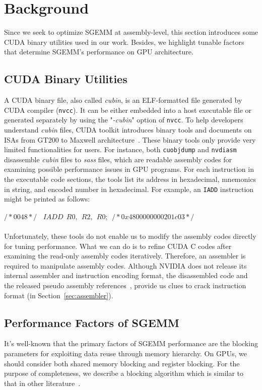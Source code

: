\section{Background}
\label{sec:background}
Since we seek to optimize SGEMM at assembly-level, this section introduces some CUDA binary utilities used in our work. Besides, we highlight tunable factors that determine SGEMM's performance on GPU architecture.

\subsection{CUDA Binary Utilities}
\label{sec:cuda}

A CUDA binary file, also called {\em cubin}, is an ELF-formatted file generated by CUDA compiler ({\tt nvcc}). It can be either embedded into a host executable file or generated separately by using the "{\em -cubin}" option of {\tt nvcc}. To help developers understand {\em cubin} files, CUDA toolkit introduces binary tools and documents on ISAs from GT200 to Maxwell architecture~\cite{gtx980}. These binary tools only provide very limited functionalities for users. For instance, both {\tt cuobjdump} and {\tt nvdiasm} disassemble {\em cubin} files to {\em sass} files, which are readable assembly codes for examining possible performance issues in GPU programs. For each instruction in the executable code sections, the tools list its address in hexadecimal, mnemonics in string, and encoded number in hexadecimal. For example, an {\tt IADD} instruction might be printed as follows: \\\\
$/*0048*/~~~~IADD~~R0,~~R2,~~R0;~~/* 0x4800000000201c03 */$\\\\
Unfortunately, these tools do not enable us to modify the assembly codes directly for tuning performance. What we can do is to refine CUDA C codes after examining the read-only assembly codes iteratively. Therefore, an assembler is required to manipulate assembly codes. Although NVIDIA does not release its internal assembler and instruction encoding format, the disassembled code and the released pseudo assembly references~\cite{ptx2015isa}, provide us clues to crack instruction format (in Section~\ref{sec:assembler}).


\subsection{Performance Factors of SGEMM}
It's well-known that the primary factors of SGEMM performance are the blocking parameters for exploiting data reuse through memory hierarchy. On GPUs, we should consider both shared memory blocking and register blocking. For the purpose of completeness, we describe a blocking algorithm which is similar to that in other literature~\cite{magma,nervana_sgemm_wiki,lai,tan}.

